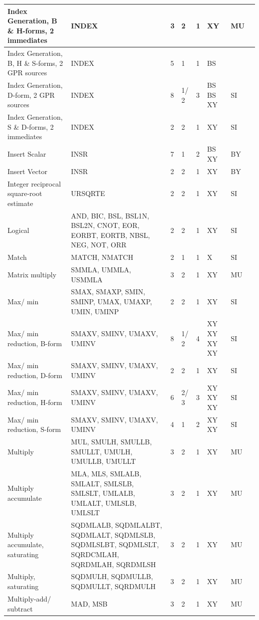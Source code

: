 \begin{longtable}{|p{1in}|p{1in}|l|l|l|p{1in}|l|p{1in}|}
\hline
Index Generation, B \& H-forms, 2 immediates & INDEX & 3 & 2 & 1 & XY & MU & \\
\hline
Index Generation, B, H \& S-forms, 2 GPR sources & INDEX & 5 & 1 & 1 & BS &  & \\
\hline
Index Generation, D-form, 2 GPR sources & INDEX & 8 & 1/ 2 & 3 & BS BS XY & SI & \\
\hline
Index Generation, S \& D-forms, 2 immediates & INDEX & 2 & 2 & 1 & XY & SI & \\
\hline
Insert Scalar & INSR & 7 & 1 & 2 & BS XY & BY & \\
\hline
Insert Vector & INSR & 2 & 2 & 1 & XY & BY & \\
\hline
Integer reciprocal square-root estimate & URSQRTE & 2 & 2 & 1 & XY & SI & \\
\hline
Logical & AND, BIC, BSL, BSL1N, BSL2N, CNOT, EOR, EORBT, EORTB, NBSL, NEG, NOT, ORR & 2 & 2 & 1 & XY & SI & \\
\hline
Match & MATCH, NMATCH & 2 & 1 & 1 & X & SI & \\
\hline
Matrix multiply & SMMLA, UMMLA, USMMLA & 3 & 2 & 1 & XY & MU & \\
\hline
Max/ min & SMAX, SMAXP, SMIN, SMINP, UMAX, UMAXP, UMIN, UMINP & 2 & 2 & 1 & XY & SI & \\
\hline
Max/ min reduction, B-form & SMAXV, SMINV, UMAXV, UMINV & 8 & 1/ 2 & 4 & XY XY XY XY & SI & \\
\hline
Max/ min reduction, D-form & SMAXV, SMINV, UMAXV, UMINV & 2 & 2 & 1 & XY & SI & \\
\hline
Max/ min reduction, H-form & SMAXV, SMINV, UMAXV, UMINV & 6 & 2/ 3 & 3 & XY XY XY & SI & \\
\hline
Max/ min reduction, S-form & SMAXV, SMINV, UMAXV, UMINV & 4 & 1 & 2 & XY XY & SI & \\
\hline
Multiply & MUL, SMULH, SMULLB, SMULLT, UMULH, UMULLB, UMULLT & 3 & 2 & 1 & XY & MU & \\
\hline
Multiply accumulate & MLA, MLS, SMLALB, SMLALT, SMLSLB, SMLSLT, UMLALB, UMLALT, UMLSLB, UMLSLT & 3 & 2 & 1 & XY & MU & \\
\hline
Multiply accumulate, saturating & SQDMLALB, SQDMLALBT, SQDMLALT, SQDMLSLB, SQDMLSLBT, SQDMLSLT, SQRDCMLAH, SQRDMLAH, SQRDMLSH & 3 & 2 & 1 & XY & MU & \\
\hline
Multiply, saturating & SQDMULH, SQDMULLB, SQDMULLT, SQRDMULH & 3 & 2 & 1 & XY & MU & \\
\hline
Multiply-add/ subtract & MAD, MSB & 3 & 2 & 1 & XY & MU & \\

\end{longtable}
